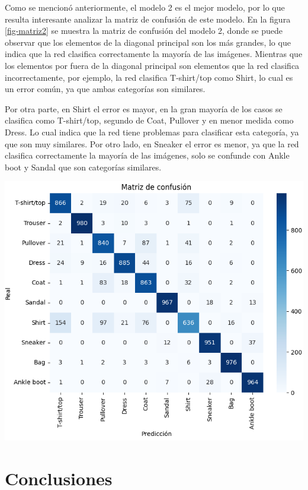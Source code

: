 \documentclass[aps,prl,reprint,groupedaddress]{revtex4-2}
\newenvironment{Figura}
  {\par\medskip\noindent\minipage{\linewidth}}
  {\endminipage\par\medskip}
\begin{document}
Como se mencionó anteriormente, el modelo 2 es el mejor modelo, por lo que 
resulta interesante analizar la matriz de confusión de este modelo. En la
figura \ref{fig-matriz2} se muestra la matriz de confusión del modelo 2, donde
se puede observar que los elementos de la diagonal principal son los más
grandes, lo que indica que la red clasifica correctamente la mayoría de las
imágenes. Mientras que los elementos por fuera de la diagonal principal son 
elementos que la red clasifica incorrectamente, por ejemplo, la red clasifica 
T-shirt/top como Shirt, lo cual es un error común, ya que ambas categorías son
similares.

Por otra parte, en Shirt el error es mayor, en la gran mayoría de los casos 
se clasifica como T-shirt/top, segundo de Coat, Pullover y en menor medida
como Dress. Lo cual indica que la red tiene problemas para clasificar esta 
categoría, ya que son muy similares. Por otro lado, en Sneaker el error es menor, 
ya que la red clasifica correctamente la mayoría de las imágenes, solo se confunde 
con Ankle boot y Sandal que son categorías similares.

\begin{Figura}
  \centering
  \includegraphics[width=1\textwidth]{figs/matrix_model2.png}
  \label{fig-matriz2}
\end{Figura}

\section{Conclusiones}
\end{document}
